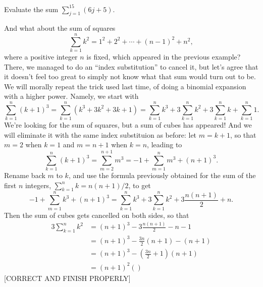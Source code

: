 \documentclass[nooutcomes]{ximera}
\begin{document}
\begin{exploration}
  Evaluate the sum $\sum_{j=1}^{15} (6j+5)$.
\end{exploration}


And what about the sum of squares $$\sum_{k=1}^n k^2 = 1^2+2^2+\cdots + (n-1)^2 + n^2,$$where a positive integer $n$ is fixed,  which appeared in the previous example? There, we managed to do an ``index substitution'' to cancel it, but let's agree that it doesn't feel too great to simply not know what that sum would turn out to be. We will morally repeat the trick used last time, of doing a binomial expansion with a higher power. Namely, we start with $$\sum_{k=1}^n (k+1)^3 = \sum_{k=1}^n (k^3+3k^2+3k+1) = \sum_{k=1}^n k^3+3\sum_{k=1}^nk^2+3\sum_{k=1}^n k + \sum_{k=1}^n1.$$We're looking for the sum of squares, but a sum of cubes has appeared! And we will eliminate it with the same index substituion as before: let $m=k+1$, so that $m=2$ when $k=1$ and $m=n+1$ when $k=n$, leading to $$\sum_{k=1}^n (k+1)^3 = \sum_{m=2}^{n+1}m^3 = -1+\sum_{m=1}^nm^3 + (n+1)^3.$$Rename back $m$ to $k$, and use the formula previously obtained for the sum of the first $n$ integers, $\sum_{k=1}^nk=n(n+1)/2$, to get $$-1+\sum_{m=1}^nk^3 + (n+1)^3 = \sum_{k=1}^nk^3 + 3\sum_{k=1}^nk^2 + 3\frac{n(n+1)}{2} + n.$$Then the sum of cubes gets cancelled on both sides, so that
\begin{align*}
  3\sum_{k=1}^n k^2 &= (n+1)^3-3\frac{n(n+1)}{2}-n-1 \\ &= (n+1)^3 - \frac{3n}{2}(n+1) - (n+1) \\ &= (n+1)^3 - \left(\frac{3n}{2}+1\right)(n+1) \\ &= (n+1)^2\left(\right)
\end{align*}
[CORRECT AND FINISH PROPERLY]
\end{document}
